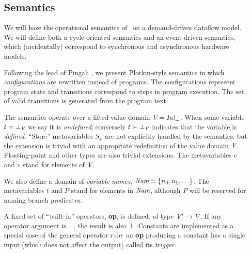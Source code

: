 \documentclass[12pt,titlepage,twoside]{article}
\begin{document}
\subsection{Semantics}\label{sec:semantics}
We will base the operational semantics of \ssiplus\ on a demand-driven
dataflow model.  We will define both a cycle-oriented semantics and an
event-driven semantics, which (incidentally) correspond to synchronous
and asynchronous hardware models.

Following the lead of Pingali \cite{pingali90:dfg}, we present Plotkin-style
semantics \cite{plotkin81:opsem} in which \emph{configurations} are
rewritten instead of programs.  The configurations represent program
state and transitions correspond to steps in program execution.  The
set of valid transitions is generated from the program text.

The semantics operate over a lifted value domain
${\mbox{\em V}}={\mbox{\em Int}}_\bot$. When some variable
$t = \bot_{\mbox{\scriptsize\em V}}$ we say it is
\emph{undefined}; conversely $t\succ\bot_{\mbox{\scriptsize\em V}}$ indicates that the
variable is \emph{defined}.  ``Store'' metavariables $S_x$ are not
explicitly handled by the semantics, but the extension is trivial with
an appropriate redefinition of the value domain ${\mbox{\em V}}$.  Floating-point
and other types are also trivial extensions.  The
metavariables $c$ and $v$ stand for elements of ${\mbox{\em V}}$.

We also define a domain of \emph{variable names},
${\mbox{\em Nam}}=\left\{n_0,n_1,\ldots\right\}$.  The metavariables $t$ and $P$ stand for
elements in ${\mbox{\em Nam}}$, although $P$ will be reserved for naming branch predicates.

A fixed set of ``built-in'' operators, \textbf{op}, is defined,
of type ${\mbox{\em V}}^* \to {\mbox{\em V}}$.  If any operator argument is $\bot$, the
result is also $\bot$.  Constants are implemented as a special case of
the general operator rule: an \textbf{op} producing a constant has a
single input (which does not affect the output) called its \emph{trigger}.
\end{document}
